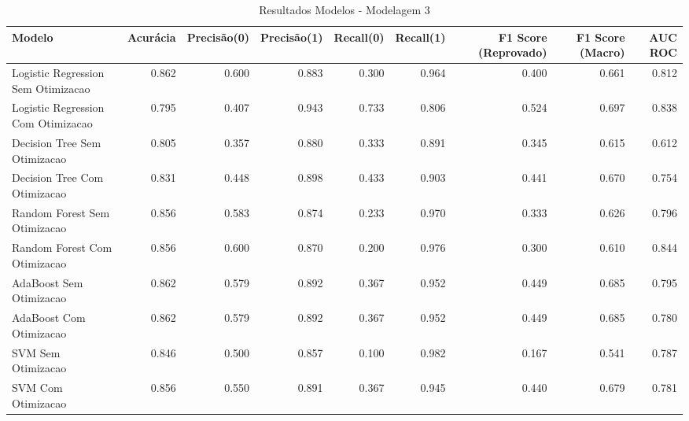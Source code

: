 \begin{table}[H] %
    \centering
    \caption{Resultados Modelos - Modelagem 3}
    \label{tab:resultados_modelagem_3}
    \renewcommand{\arraystretch}{1.25} %
    \begin{adjustwidth}{ -1in }{ -1in } %
    \centering %
    \small %
    \begin{tabular}{lrrrrrrrr}
\toprule
                            Modelo &  Acurácia &  Precisão(0) &  Precisão(1) &  Recall(0) &  Recall(1) &  F1 Score (Reprovado) &  F1 Score (Macro) &  AUC ROC \\
\midrule
Logistic Regression Sem Otimizacao &     0.862 &        0.600 &        0.883 &      0.300 &      0.964 &                 0.400 &             0.661 &    0.812 \\
Logistic Regression Com Otimizacao &     0.795 &        0.407 &        0.943 &      0.733 &      0.806 &                 0.524 &             0.697 &    0.838 \\
      Decision Tree Sem Otimizacao &     0.805 &        0.357 &        0.880 &      0.333 &      0.891 &                 0.345 &             0.615 &    0.612 \\
      Decision Tree Com Otimizacao &     0.831 &        0.448 &        0.898 &      0.433 &      0.903 &                 0.441 &             0.670 &    0.754 \\
      Random Forest Sem Otimizacao &     0.856 &        0.583 &        0.874 &      0.233 &      0.970 &                 0.333 &             0.626 &    0.796 \\
      Random Forest Com Otimizacao &     0.856 &        0.600 &        0.870 &      0.200 &      0.976 &                 0.300 &             0.610 &    0.844 \\
           AdaBoost Sem Otimizacao &     0.862 &        0.579 &        0.892 &      0.367 &      0.952 &                 0.449 &             0.685 &    0.795 \\
           AdaBoost Com Otimizacao &     0.862 &        0.579 &        0.892 &      0.367 &      0.952 &                 0.449 &             0.685 &    0.780 \\
                SVM Sem Otimizacao &     0.846 &        0.500 &        0.857 &      0.100 &      0.982 &                 0.167 &             0.541 &    0.787 \\
                SVM Com Otimizacao &     0.856 &        0.550 &        0.891 &      0.367 &      0.945 &                 0.440 &             0.679 &    0.781 \\
\bottomrule
\end{tabular}
    \end{adjustwidth}
    \renewcommand{\arraystretch}{1.0} %
\end{table}
